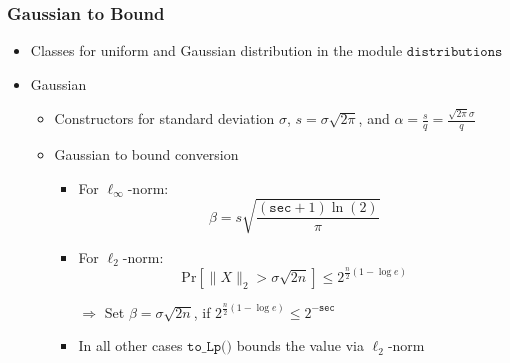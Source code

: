 \documentclass[t, aspectratio=169]{beamer}
\begin{document}
\begin{frame}
    \frametitle{Gaussian to Bound} %
    \begin{itemize}[<+->]
        \item Classes for uniform and Gaussian distribution in the module $\texttt{distributions}$
        \item Gaussian
              \begin{itemize}[<+->]
                  \item Constructors for standard deviation $\sigma$, $s =\sigma \sqrt{2 \pi}$, and $\alpha = \frac{s}{q} = \frac{\sqrt{2\pi} \sigma}{q}$
                  \item Gaussian to bound conversion
                        \begin{itemize}[<+->]
                            \item For $\ell_\infty$-norm:
                                  \begin{equation*}
                                      \beta  = s \sqrt{\frac{(\texttt{sec} + 1) \ln(2)}{\pi}}
                                  \end{equation*}
                            \item For $\ell_2$-norm:
                                  \begin{equation*}
                                      \text{Pr}\left[ \|X\|_2 > \sigma \sqrt{2n} \right] \leq 2^{\frac{n}{2}(1 -\log e)}
                                  \end{equation*}
                            \item[$\Rightarrow$] Set $\beta = \sigma \sqrt{2n}$, if $2^{\frac{n}{2}(1 -\log e)} \leq 2^{-\texttt{sec}}$
                            \item In all other cases $\texttt{to\_Lp()}$ bounds the value via $\ell_2$-norm
                        \end{itemize}
              \end{itemize}
    \end{itemize}
\end{frame}
\end{document}
